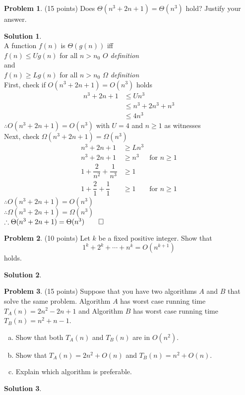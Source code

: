\documentclass{article}
\theoremstyle{definition}
\newtheorem{problem}{Problem}
\newtheorem*{solution}{Solution}
\begin{document}
\begin{problem} (15 points) 
Does $\Theta(n^3+2n+1) = \Theta(n^3)$ hold?  Justify your answer.
\end{problem}
\begin{solution}\ \\
A function $f(n)$ is $\Theta(g(n))$ iff \\ 
\hspace{10pt} $f(n) \le U g(n)$ for all $n>n_0$ \textit{$O$ definition} \\
and\\
\hspace{10pt} $f(n) \ge L g(n)$ for all $n>n_0$ \textit{$\Omega$ definition} \\
First, check if $O(n^3+2n+1) = O(n^3)$ holds
\begin{align*}
    n^3+2n+1 &\le U n^3 \\
    &\le n^3 + 2 n^3 + n^3\\
    &\le 4n^3
\end{align*}
$\therefore O(n^3+2n+1) = O(n^3)$ with $U=4$ and $n \ge 1$ as witnesses \\
Next, check $\Omega(n^3+2n+1) = \Omega(n^3)$
\begin{align*}
    n^3+2n+1 &\ge L n^3 \\
    n^3+2n+1 &\ge n^3 &\text{for $n \ge 1$}\\
    1 + \dfrac{2}{n^2} + \dfrac{1}{n^3} &\ge 1\\
    1 + \dfrac{2}{1} + \dfrac{1}{1} &\ge 1&\text{for $n \ge 1$}
\end{align*}
$\therefore O(n^3+2n+1) = O(n^3)$ \\
$\therefore \Omega(n^3+2n+1) = \Omega(n^3)$\\
$\therefore \Theta(n^3+2n+1) = \Theta(n^3) \qed$
\end{solution}

\begin{problem} (10 points)
Let $k$ be a fixed positive integer. Show that 
$$ 1^k+2^k+\cdots + n^k  = O(n^{k+1}) $$ holds.
\end{problem}
\begin{solution}
\end{solution}

\begin{problem} (15 points)
Suppose that you have two algorithms $A$ and $B$ that solve the same
problem. Algorithm $A$ has worst case running time $T_A(n) = 2n^2-2n+1$ 
and Algorithm $B$ has worst case running time $T_B(n) = n^2+n-1$. 
\begin{enumerate}[a)]
\item Show that both $T_A(n)$ and $T_B(n)$ are in $O(n^2)$. 
\item Show that $T_A(n) = 2n^2 + O(n)$ and $T_B(n) = n^2 +O(n)$. 
\item Explain which algorithm is preferable. 
\end{enumerate}
\end{problem}
\begin{solution}
\end{solution}
\end{document}
